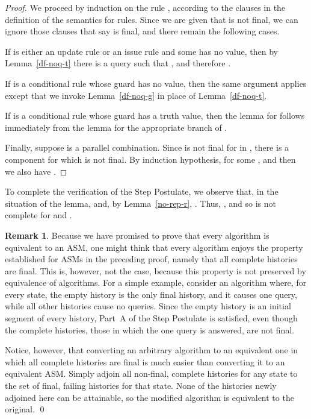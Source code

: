 \documentclass{LMCS}
\theoremstyle{definition}
\newtheorem{rmk}[thm]{Remark}
\begin{document}
\begin{proof}
  We proceed by induction on the rule , according to the clauses in
  the definition of the semantics for rules.  Since we are given that
   is not final, we can ignore those clauses that say  is
  final, and there remain the following cases.

If  is either an update rule  or an issue
rule  and some  has no value, then
by Lemma~\ref{df-noq-t} there is a query  such that
, and therefore .

If  is a conditional rule whose guard has no value, then the same
argument applies except that we invoke Lemma~\ref{df-noq-g} in place
of Lemma~\ref{df-noq-t}.

If  is a conditional rule whose guard has a truth value, then the
lemma for  follows immediately from the lemma for the appropriate
branch of .

Finally, suppose  is a parallel combination.  Since  is not
final for  in , there is a component  for which  is
not final.  By induction hypothesis,  for some
, and then we also have .
\end{proof}

To complete the verification of the Step Postulate, we observe that,
in the situation of the lemma,  and, by
Lemma~\ref{no-rep-r}, .  Thus,
, and so  is not complete for 
and .

\begin{rmk}
  Because we have promised to prove that every algorithm is equivalent
  to an ASM, one might think that every algorithm enjoys the property
  established for ASMs in the preceding proof, namely that all
  complete histories are final.  This is, however, not the case,
  because this property is not preserved by equivalence of algorithms.
  For a simple example, consider an algorithm where, for every state,
  the empty history is the only final history, and it causes one
  query, while all other histories cause no queries.  Since the empty
  history is an initial segment of every history, Part~A of the Step
  Postulate is satisfied, even though the complete histories, those in
  which the one query is answered, are not final.

Notice, however, that converting an arbitrary algorithm to an
equivalent one in which all complete histories are final is much
easier than converting it to an equivalent ASM.  Simply adjoin all
non-final, complete histories for any state to the set of final,
failing histories for that state.  None of the histories newly
adjoined here can be attainable, so the modified algorithm is
equivalent to the original.  \qed\end{rmk}
\end{document}
